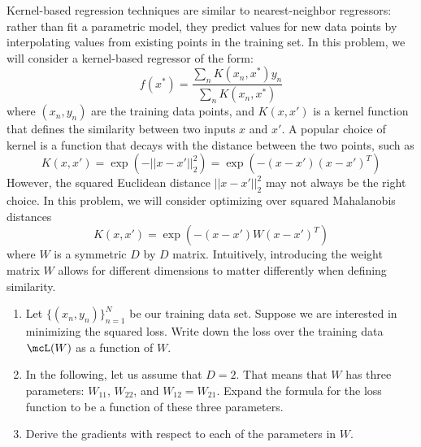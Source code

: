 \documentclass[submit]{harvardml}
\begin{document}
\begin{problem}

Kernel-based regression techniques are similar to nearest-neighbor
regressors: rather than fit a parametric model, they predict values
for new data points by interpolating values from existing points in
the training set.  In this problem, we will consider a kernel-based
regressor of the form:
\begin{equation*}
  f(x^*) = \frac{ \sum_{n} K(x_n,x^*) y_n  }{ \sum_{n} K(x_n,x^*) } 
\end{equation*}
where $(x_n,y_n)$ are the training data points, and $K(x,x')$ is a
kernel function that defines the similarity between two inputs $x$ and
$x'$.  A popular choice of kernel is a function that decays with
the distance between the two points, such as
\begin{equation*}
  K(x,x') = \exp(-||x-x'||^2_2) = \exp(-(x-x') (x-x')^T ) 
\end{equation*} 
However, the squared Euclidean distance $||x-x'||^2_2$ may not always
be the right choice.  In this problem, we will consider optimizing
over squared Mahalanobis distances
\begin{equation*}
  K(x,x') = \exp(-(x-x') W (x-x')^T ) 
  \label{eqn:distance}
\end{equation*} 
where $W$ is a symmetric $D$ by $D$ matrix.  Intuitively, introducing
the weight matrix $W$ allows for different dimensions to matter
differently when defining similarity.

\begin{enumerate}

\item Let $\{(x_n,y_n)\}_{n=1}^N$ be our training data set.  Suppose
  we are interested in minimizing the squared loss.  Write down the
  loss over the training data $\mcL(W)$ as a function of $W$.  

\item In the following, let us assume that $D = 2$.  That means that
  $W$ has three parameters: $W_{11}$, $W_{22}$, and $W_{12} = W_{21}$.
  Expand the formula for the loss function to be a function of these
  three parameters.

\item Derive the gradients with respect to each of the parameters in
  $W$.


\end{enumerate}
\end{problem}
\end{document}
